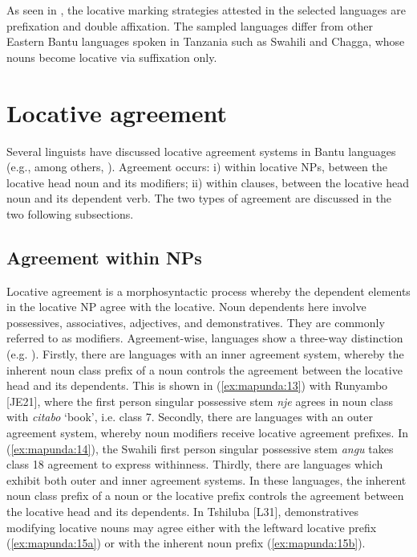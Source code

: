 \documentclass[output=paper ]{langscibook}
\begin{document}
As seen in , the locative marking strategies attested in the selected languages are prefixation and double affixation. The sampled languages differ from other Eastern Bantu languages spoken in Tanzania such as Swahili and Chagga, whose nouns become locative via suffixation only. 

\section{Locative agreement} \label{sec:mapunda:3}

Several linguists have discussed locative agreement systems in Bantu languages (e.g., among others, \citealt{Stucky1976, Harford1983, Kahigi2005, Marten2012, NgungaMpofu2013}). Agreement occurs: i) within locative NPs, between the locative head noun and its modifiers; ii) within clauses, between the locative head noun and its dependent verb. The two types of agreement are discussed in the two following subsections.

\subsection{Agreement within NPs}\label{sec:mapunda:3.1} %

Locative agreement is a morphosyntactic process whereby the dependent elements in the locative NP agree with the locative. Noun dependents here involve possessives, associatives, adjectives, and demonstratives. They are commonly referred to as modifiers. Agreement-wise, languages show a three-way distinction (e.g. \citealt{Marten2012, Machobane1995}). Firstly, there are languages with an inner agreement system, whereby the inherent noun class prefix of a noun controls the agreement between the locative head and its dependents. This is shown in (\ref{ex:mapunda:13}) with Runyambo [JE21], where the first person singular possessive stem \textit{nje} agrees in noun class with \textit{citabo} ‘book’, i.e. class 7. Secondly, there are languages with an outer agreement system, whereby noun modifiers receive locative agreement prefixes. In (\ref{ex:mapunda:14}), the Swahili first person singular possessive stem \textit{angu} takes class 18 agreement to express withinness. Thirdly, there are languages which exhibit both outer and inner agreement systems. In these languages, the inherent noun class prefix of a noun or the locative prefix controls the agreement between the locative head and its dependents. In Tshiluba [L31], demonstratives modifying locative nouns may agree either with the leftward locative prefix (\ref{ex:mapunda:15a}) or with the inherent noun prefix (\ref{ex:mapunda:15b}). 
\end{document}
